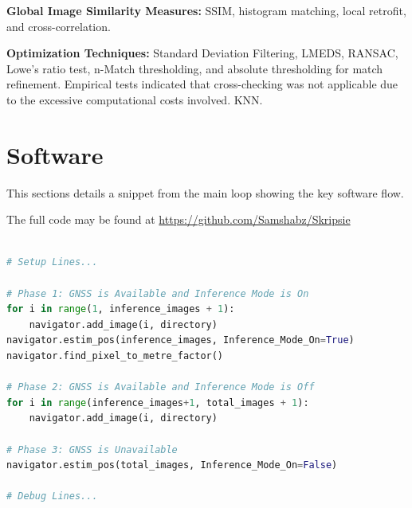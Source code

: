 \textbf{Global Image Similarity Measures:} SSIM, histogram matching, local retrofit, and cross-correlation.

\textbf{Optimization Techniques:} Standard Deviation Filtering, LMEDS, RANSAC, Lowe's ratio test, n-Match thresholding, and absolute thresholding for match refinement. Empirical tests indicated that cross-checking was not applicable due to the excessive computational costs involved. KNN.


\section{Software}
This sections details a snippet from the main loop showing the key software flow. 

The full code may be found at \url{https://github.com/Samshabz/Skripsie}

\begin{lstlisting}[language=Python, basicstyle=\ttfamily, keywordstyle=\bfseries, commentstyle=\itshape\color{gray}]
    
# Setup Lines...

# Phase 1: GNSS is Available and Inference Mode is On
for i in range(1, inference_images + 1): 
    navigator.add_image(i, directory)
navigator.estim_pos(inference_images, Inference_Mode_On=True)
navigator.find_pixel_to_metre_factor()

# Phase 2: GNSS is Available and Inference Mode is Off
for i in range(inference_images+1, total_images + 1):
    navigator.add_image(i, directory)

# Phase 3: GNSS is Unavailable
navigator.estim_pos(total_images, Inference_Mode_On=False)

# Debug Lines...

\end{lstlisting}





